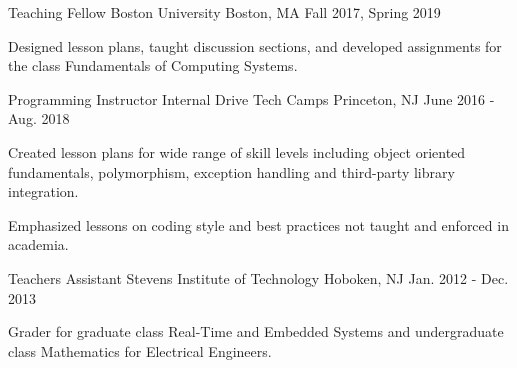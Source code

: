



\begin{cventries}
  \cventry
    {Teaching Fellow} %
    {Boston University} %
    {Boston, MA} %
    {Fall 2017, Spring 2019} %
    {
      \begin{cvitems} %
\item {Designed lesson plans, taught discussion sections, and developed assignments
        for  the class
Fundamentals of Computing Systems.}
      \end{cvitems}
    }

  \cventry
    {Programming Instructor} %
    {Internal Drive Tech Camps} %
    {Princeton, NJ} %
    {June 2016 - Aug. 2018} %
    {
      \begin{cvitems} %
      \item {Created lesson plans for wide range of skill levels including object oriented fundamentals, polymorphism, exception handling and third-party library integration.}
\item {Emphasized lessons on coding style and best practices not taught and enforced in academia.}
      \end{cvitems}
    }

  \cventry
    {Teachers Assistant} %
    {Stevens Institute of Technology} %
    {Hoboken, NJ} %
    {Jan. 2012 - Dec. 2013} %
    {
      \begin{cvitems} %
\item {Grader for graduate class Real-Time and Embedded Systems and
undergraduate class Mathematics for Electrical Engineers.}
      \end{cvitems}
    }

\end{cventries}
